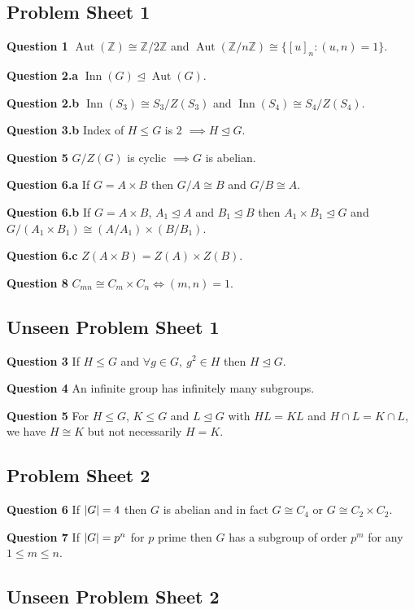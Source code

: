 \documentclass[12pt]{article}
\theoremstyle{definition}
\DeclarePairedDelimiter\abs{\lvert}{\rvert}
\newcommand{\Z}{\mathbb{Z}}
\newcommand{\normsg}{\trianglelefteq}
\newcommand{\question}[1]{\noindent\textbf{Question #1} }
\DeclareMathOperator{\Aut}{Aut}
\DeclareMathOperator{\Inn}{Inn}
\begin{document}
\subsection{Problem Sheet 1}

\question{1} $\Aut(\Z) \cong \Z / 2\Z$ and $\Aut(\Z / n\Z) \cong \{[u]_n : (u, n) = 1\}$.

\question{2.a} $\Inn(G) \normsg \Aut(G)$.

\question{2.b} $\Inn(S_3) \cong S_3 / Z(S_3)$ and $\Inn(S_4) \cong S_4 / Z(S_4)$.

\question{3.b} Index of $H \leq G$ is 2 $\implies H \normsg G$.

\question{5} $G / Z(G)$ is cyclic $\implies G$ is abelian.

\question{6.a} If $G = A \times B$ then $G / A \cong B$ and $G / B \cong A$.

\question{6.b} If $G = A \times B$, $A_1 \normsg A$ and $B_1 \normsg B$ then $A_1 \times B_1 \normsg G$ and $G / (A_1 \times B_1) \cong (A / A_1) \times (B / B_1)$.

\question{6.c} $Z(A \times B) = Z(A) \times Z(B)$.

\question{8} $C_{mn} \cong C_m \times C_n \iff (m, n) = 1$.

\subsection{Unseen Problem Sheet 1}

\question{3} If $H \leq G$ and $\forall g \in G,\ g^2 \in H$ then $H \normsg G$.

\question{4} An infinite group has infinitely many subgroups.

\question{5} For $H \leq G$, $K \leq G$ and $L \normsg G$ with $HL = KL$ and $H \cap L = K \cap L$, we have $H \cong K$ but not necessarily $H = K$.

\subsection{Problem Sheet 2}

\question{6} If $\abs{G} = 4$ then $G$ is abelian and in fact $G \cong C_4$ or $G \cong C_2 \times C_2$.

\question{7} If $\abs{G} = p^n$ for $p$ prime then $G$ has a subgroup of order $p^m$ for any $1 \leq m \leq n$.

\subsection{Unseen Problem Sheet 2}
\end{document}
